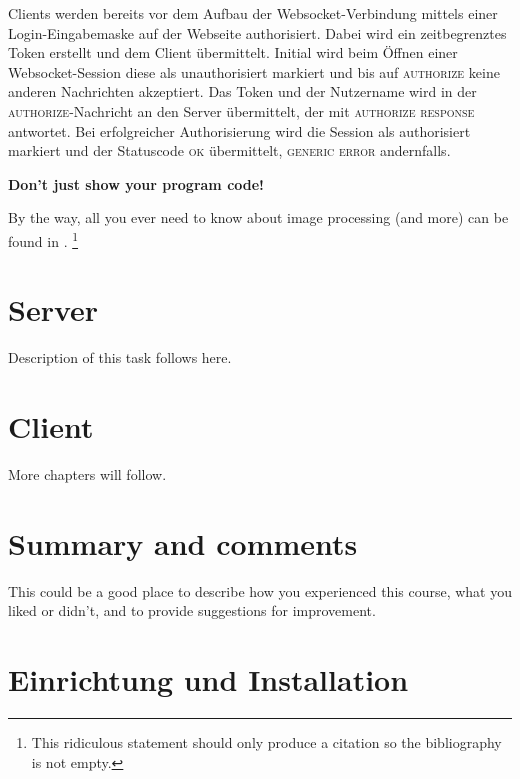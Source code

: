 \documentclass[english,11pt]{report}
\begin{document}
Clients werden bereits vor dem Aufbau der Websocket-Verbindung mittels einer Login-Eingabemaske
auf der Webseite authorisiert. Dabei wird ein zeitbegrenztes Token erstellt und dem Client
übermittelt. Initial wird beim Öffnen einer Websocket-Session diese als unauthorisiert markiert
und bis auf \textsc{authorize} keine anderen Nachrichten akzeptiert. Das Token und der Nutzername wird in
der \textsc{authorize}-Nachricht an den Server übermittelt, der mit \textsc{authorize response} antwortet.
Bei erfolgreicher Authorisierung wird die Session als authorisiert markiert und der Statuscode \textsc{ok}
übermittelt, \textsc{generic error} andernfalls.

%
\begin{center}
\textbf{Don't just show your program code!} 
\end{center}
%
By the way, all you ever need to know about image processing (and more) can be 
found in \cite{BurgerBurge08}.%
\footnote{This ridiculous statement should only produce a citation so the 
bibliography is not empty.} 


\chapter{Server}

Description of this task follows here.



\chapter{Client}

More chapters will follow.


\chapter{Summary and comments}

This could be a good place to describe how you experienced this course, what you liked or didn't, and to provide suggestions for improvement.



\chapter{Einrichtung und Installation}
\end{document}
